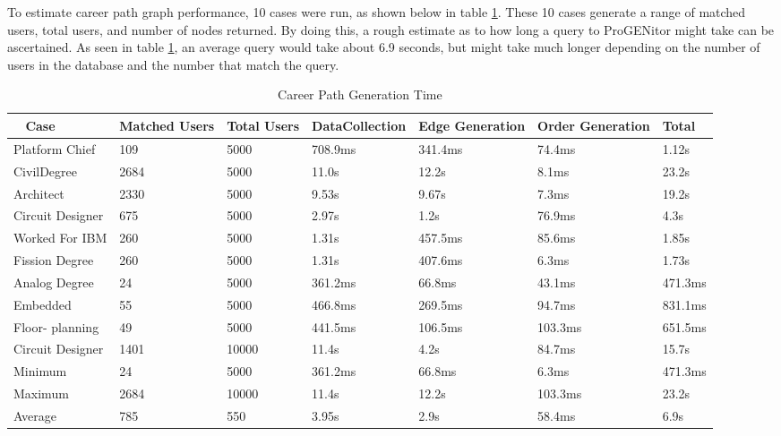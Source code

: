 To estimate career path graph performance, 10 cases were run, as shown below in
table \ref{table:career performance}.  These 10 cases generate a range of matched
users, total users, and number of nodes returned.  By doing this, a rough
estimate as to how long a query to ProGENitor might take can be ascertained.  As
seen in table \ref{table:career performance}, an average query would take about
6.9 seconds, but might take much longer depending on the number of users in the
database and the number that match the query.

\begin{table}[H]
  \centering
  \begin{tabular}{|p{17mm}|p{16mm}|p{10mm}|p{18mm}|p{19mm}|p{20mm}|p{14mm}|}
  \hline
  \
  Case&Matched Users&Total Users&Data\newline Collection&Edge\newline
  Generation&Order Generation&Total\\
  \hline\hline
  Platform Chief&109&5000&708.9ms&341.4ms&74.4ms&1.12s\\ \hline
  Civil\newline Degree&2684&5000&11.0s&12.2s&8.1ms&23.2s\\ \hline 
  Architect&2330&5000&9.53s&9.67s&7.3ms&19.2s\\ \hline
  Circuit Designer&675&5000&2.97s&1.2s&76.9ms&4.3s\\ \hline
  Worked For IBM&260&5000&1.31s&457.5ms&85.6ms&1.85s\\ \hline
  Fission Degree&260&5000&1.31s&407.6ms&6.3ms&1.73s\\ \hline
  Analog Degree&24&5000&361.2ms&66.8ms&43.1ms&471.3ms\\ \hline
  Embedded&55&5000&466.8ms&269.5ms&94.7ms&831.1ms\\ \hline
  Floor- \newline planning&49&5000&441.5ms&106.5ms&103.3ms&651.5ms\\ \hline
  Circuit Designer&1401&10000&11.4s&4.2s&84.7ms&15.7s\\ \hline
  \hline\hline
  Minimum&24&5000&361.2ms&66.8ms&6.3ms&471.3ms\\ \hline
  Maximum&2684&10000&11.4s&12.2s&103.3ms&23.2s\\ \hline
  Average&785&550&3.95s&2.9s&58.4ms&6.9s\\ \hline
  \end{tabular}
  \caption{Career Path Generation Time}
  \label{table:career performance}
\end{table}

